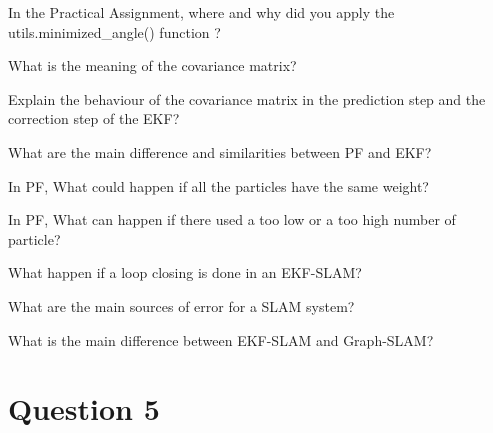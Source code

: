 \documentclass[parcial]{lcc}
\begin{document}
\maketitle




\ejercicio In the Practical Assignment, where and why did you apply the utils.minimized\_angle() function ?

\ejercicio What is the meaning of the covariance matrix?

\ejercicio Explain the behaviour of the covariance matrix in the prediction step and the correction step of the EKF?

\ejercicio What are the main difference and similarities between PF and EKF?

\ejercicio In PF, What could happen if all the particles have the same weight?

\ejercicio In PF, What can happen if there used a too low or a too high number of particle?

\ejercicio What happen if a loop closing is done in an EKF-SLAM?


\ejercicio What are the main sources of error for a SLAM system?

\ejercicio What is the main difference between EKF-SLAM and Graph-SLAM?


\section*{Question 5}
\end{document}
